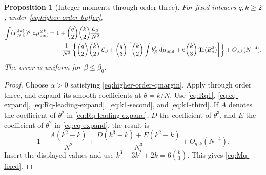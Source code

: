 \documentclass[11pt,reqno]{amsart}
\numberwithin{equation}{section}
\theoremstyle{plain}
\newtheorem{prop}[prop]{Proposition}
\theoremstyle{definition}
\newcommand{\dd}{\mathop{}\!\mathrm d}
\newcommand{\Tr}{\operatorname{Tr}}
\newcommand{\be}{\beta}
\newcommand{\muunif}{\mu_{\mathrm{unif}}}
\begin{document}
\begin{prop}[Integer moments through order three]\label{prop:moments-next}
For fixed integers $q,k\geq2$, under \eqref{eq:higher-order-buffer},
\begin{align}\label{eq:Mq-fixed}
 \int(F_{N,\be}^{(k)})^q\,\dd \muunif^{\otimes k}
 &=1+\binom q2\binom k2\frac{\mathcal C_\be}{N^2}\notag\\
 &\quad+\frac1{N^3}\left\{
 \binom q2\binom k2\mathcal L_\be
 +\binom q3\left[\binom k2\int b_\be^3\,\dd \muunif
              +6\binom k3\Tr(B_\be^3)\right]\right\}
 +O_{q,k}(N^{-4}).
\end{align}
The error is uniform for $\be\leq\be_0$.
\end{prop}
\begin{proof}
Choose $\alpha>0$ satisfying \eqref{eq:higher-order-qmargin}. Apply  through order three, and expand its smooth coefficients at $\theta=k/N$. Use \eqref{eq:Rq1}, \eqref{eq:cq-expand}, \eqref{eq:Rq-leading-expand}, \eqref{eq:k1-second}, and \eqref{eq:k1-third}. If $A$ denotes the coefficient of $\theta^2$ in \eqref{eq:Rq-leading-expand}, $D$ the coefficient of $\theta^3$, and $E$ the coefficient of $\theta^2$ in \eqref{eq:cq-expand}, the result is
\begin{equation}\label{eq:fixed-intermediate}
 1+\frac{A(k^2-k)}{N^2}+\frac{D(k^3-k)+E(k^2-k)}{N^3}+O_{q,k}(N^{-4}).
\end{equation}
Insert the displayed values and use $k^3-3k^2+2k=6\binom k3$. This gives \eqref{eq:Mq-fixed}.
\end{proof}
\end{document}
